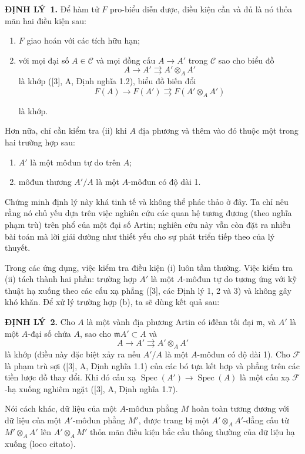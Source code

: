 \documentclass[11pt,twoside,openany]{book}
\numberwithin{equation}{section}
\newcommand{\src}[1]{%
  \phantomsection\hypertarget{src:\fgasourceid:#1}{}%
  \marginpar{\raggedleft\footnotesize\sffamily #1}%
}
\newcommand{\fgasourceid}{unset}
\newcommand{\result}[2]{\par\medskip\noindent\textbf{#1\if\relax\detokenize{#2}\relax\else\ #2\fi.}\quad}
\begin{document}
\result{ĐỊNH LÝ}{1} Để hàm tử $F$ pro-biểu diễn được, điều kiện cần và đủ là
nó thỏa mãn hai điều kiện sau:
\begin{enumerate}
\item[(i)] $F$ giao hoán với các tích hữu hạn;
\item[(ii)] với mọi đại số $A\in\mathcal C$ và mọi đồng cấu
$A\longrightarrow A'$ trong $\mathcal C$ sao cho biểu đồ
\[
  A\longrightarrow A'\rightrightarrows A'\otimes_A A'
\]
là khớp ([3], A, Định nghĩa 1.2), biểu đồ biến đổi
\[
  F(A)\longrightarrow F(A')\rightrightarrows F(A'\otimes_A A')
\]

\src{378}
là khớp.
\end{enumerate}
Hơn nữa, chỉ cần kiểm tra (ii) khi $A$ địa phương và thêm vào đó thuộc một
trong hai trường hợp sau:
\begin{enumerate}
\item[(a)] $A'$ là một môđun tự do trên $A$;
\item[(b)] môđun thương $A'/A$ là một $A$-môđun có độ dài 1.
\end{enumerate}

Chứng minh định lý này khá tinh tế và không thể phác thảo ở đây. Ta chỉ nêu
rằng nó chủ yếu dựa trên việc nghiên cứu các quan hệ tương đương (theo nghĩa
phạm trù) trên phổ của một đại số Artin; nghiên cứu này vẫn còn đặt ra nhiều
bài toán mà lời giải dường như thiết yếu cho sự phát triển tiếp theo của lý
thuyết.

Trong các ứng dụng, việc kiểm tra điều kiện (i) luôn tầm thường. Việc kiểm tra
(ii) tách thành hai phần: trường hợp $A'$ là một $A$-môđun tự do tương ứng
với kỹ thuật hạ xuống theo các cấu xạ phẳng ([3], các Định lý 1, 2 và 3) và
không gây khó khăn. Để xử lý trường hợp (b), ta sẽ dùng kết quả sau:

\result{ĐỊNH LÝ}{2} Cho $A$ là một vành địa phương Artin có iđêan tối đại
$\mathfrak m$, và $A'$ là một $A$-đại số chứa $A$, sao cho
$\mathfrak mA'\subset A$ và
\[
  A\longrightarrow A'\rightrightarrows A'\otimes_A A'
\]
là khớp (điều này đặc biệt xảy ra nếu $A'/A$ là một $A$-môđun có độ dài 1).
Cho $\mathcal F$ là phạm trù sợi ([3], A, Định nghĩa 1.1) của các bó tựa kết
hợp và phẳng trên các tiền lược đồ thay đổi. Khi đó cấu xạ
$\operatorname{Spec}(A')\longrightarrow\operatorname{Spec}(A)$ là một cấu
xạ $\mathcal F$-hạ xuống nghiêm ngặt ([3], A, Định nghĩa 1.7).

Nói cách khác, dữ liệu của một $A$-môđun phẳng $M$ hoàn toàn tương đương với
dữ liệu của một $A'$-môđun phẳng $M'$, được trang bị một
$A'\otimes_AA'$-đẳng cấu từ $M'\otimes_AA'$ lên $A'\otimes_AM'$ thỏa mãn
điều kiện bắc cầu thông thường của dữ liệu hạ xuống (loco citato).
\end{document}
